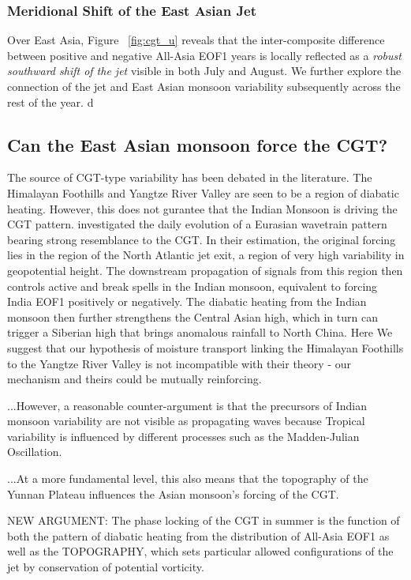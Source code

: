 \subsubsection{Meridional Shift of the East Asian Jet}

	Over East Asia, Figure ~\ref{fig:cgt_u} reveals that the inter-composite difference between positive and negative All-Asia EOF1 years is locally reflected as a \textit{robust southward shift of the jet} visible in both July and August. We further explore the connection of the jet and East Asian monsoon variability subsequently across the rest of the year. d
	
\subsection{Can the East Asian monsoon force the CGT?}

	The source of CGT-type variability has been debated in the literature. The Himalayan Foothills and Yangtze River Valley are seen to be a region of diabatic heating. However, this does not gurantee that the Indian Monsoon is driving the CGT pattern. \citet{Ding2007} investigated the daily evolution of a Eurasian wavetrain pattern bearing strong resemblance to the CGT. In their estimation, the original forcing lies in the region of the North Atlantic jet exit, a region of very high variability in geopotential height. The downstream propagation of signals from this region then controls active and break spells in the Indian monsoon, equivalent to forcing India EOF1 positively or negatively. The diabatic heating from the Indian monsoon then further strengthens the Central Asian high, which in turn can trigger a Siberian high that brings anomalous rainfall to North China. Here We suggest that our hypothesis of moisture transport linking the Himalayan Foothills to the Yangtze River Valley \citep{Day2015} is not incompatible with their theory - our mechanism and theirs could be mutually reinforcing.

	...However, a reasonable counter-argument is that the precursors of Indian monsoon variability are not visible as propagating waves because Tropical variability is influenced by different processes such as the Madden-Julian Oscillation.

	...At a more fundamental level, this also means that the topography of the Yunnan Plateau influences the Asian monsoon's forcing of the CGT. 
	
	NEW ARGUMENT: The phase locking of the CGT in summer is the function of both the pattern of diabatic heating from the distribution of All-Asia EOF1 as well as the TOPOGRAPHY, which sets particular allowed configurations of the jet by conservation of potential vorticity.

